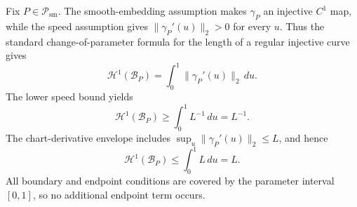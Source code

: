 Fix \(P\in\mathcal P_{\mathrm{sm}}\).  The smooth-embedding assumption makes \(\gamma_P\) an injective \(C^1\) map, while the speed assumption gives \(\lVert\gamma_P'(u)\rVert_2>0\) for every \(u\).  Thus the standard change-of-parameter formula for the length of a regular injective curve gives
\[
\mathcal H^1(\mathcal B_P)=\int_0^1\lVert\gamma_P'(u)\rVert_2\,du.
\]
The lower speed bound yields
\[
\mathcal H^1(\mathcal B_P)\geq\int_0^1L^{-1}\,du=L^{-1}.
\]
The chart-derivative envelope includes \(\sup_u\lVert\gamma_P'(u)\rVert_2\leq L\), and hence
\[
\mathcal H^1(\mathcal B_P)
\leq\int_0^1L\,du=L.
\]
All boundary and endpoint conditions are covered by the parameter interval \([0,1]\), so no additional endpoint term occurs.